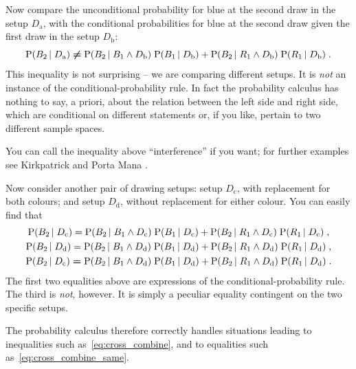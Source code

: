 \documentclass[\ifafour a4paper,12pt,\else a5paper,10pt,\fi%
onecolumn,oneside,article,%
british%
]{memoir}
\theoremstyle{remark}
\theoremstyle{innote}
\newcommand*{\citey}{\parencites*}
\newcommand*{\p}{\mathrm{P}}%
\renewcommand*{\|}[1][]{\nonscript\,#1\vert\nonscript\;\mathopen{}}
\newcommand*{\sect}{\S}%
\newcommand*{\yDa}{D_{\textrm{a}}}
\newcommand*{\yDb}{D_{\textrm{b}}}
\newcommand*{\yDc}{D_{\textrm{c}}}
\newcommand*{\yDd}{D_{\textrm{d}}}
\begin{document}
\medskip

Now compare the unconditional probability for blue at the second draw in
the setup $\yDa$, with the conditional probabilities for blue at the second
draw given the first draw in the setup $\yDb$:
\begin{equation}
  \label{eq:cross_combine}
  \p(B_{2} \| \yDa) \mathrel{\bm{\ne}}
  \p(B_{2} \| B_{1} \land \yDb) \; \p( B_{1} \| \yDb) +
  \p(B_{2} \| R_{1} \land \yDb)  \; \p( R_{1} \| \yDb) \;.
\end{equation}
This inequality is not surprising -- we are comparing different setups. It
is \emph{not} an instance of the conditional-probability rule. In fact the
probability calculus has nothing to say, a priori, about the relation
between the left side and right side, which are conditional on different
statements or, if you like, pertain to two different sample spaces.

You can call the inequality above \enquote{interference} if you want; for
further examples see Kirkpatrick
\citey{kirkpatrick2001_r2003,kirkpatrick2002_r2003} and Porta Mana
\citey[\sect~IV]{portamana2003_r2004}.

\medskip

Now consider another pair of drawing setups: setup $\yDc$, with replacement
for both colours; and setup $\yDd$, without replacement for either colour.
You can easily find that
\begin{gather}
  \p(B_{2} \| \yDc) =%
  \p(B_{2} \| B_{1} \land \yDc) \; \p( B_{1} \| \yDc) +
  \p(B_{2} \| R_{1} \land \yDc)  \; \p( R_{1} \| \yDc) \;,
  \\
  \p(B_{2} \| \yDd) =%
  \p(B_{2} \| B_{1} \land \yDd) \; \p( B_{1} \| \yDd) +
  \p(B_{2} \| R_{1} \land \yDd)  \; \p( R_{1} \| \yDd) \;,
  \\
  \label{eq:cross_combine_same}
  \p(B_{2} \| \yDc) \mathrel{\bm{=}}
  \p(B_{2} \| B_{1} \land \yDd) \; \p( B_{1} \| \yDd) +
  \p(B_{2} \| R_{1} \land \yDd)  \; \p( R_{1} \| \yDd) \;.
\end{gather}
The first two equalities above are expressions of the
conditional-probability rule. The third is \emph{not}, however. It is
simply a peculiar equality contingent on the two specific setups.

The probability calculus therefore correctly handles situations leading to
inequalities such as~\eqref{eq:cross_combine}, and to equalities such
as~\eqref{eq:cross_combine_same}.

\medskip
\end{document}
